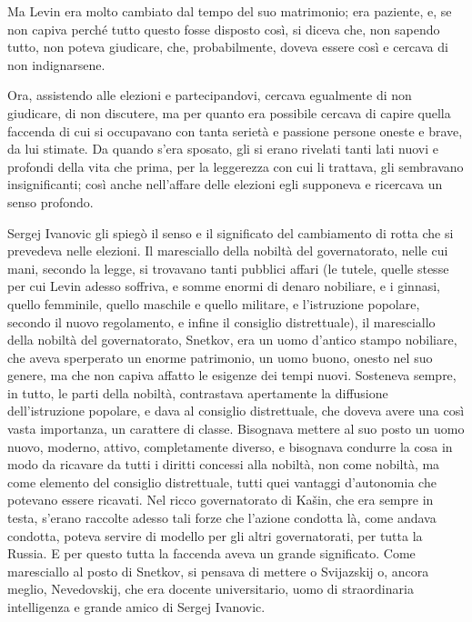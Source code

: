Ma Levin era molto cambiato dal tempo del suo matrimonio; era paziente, e, se non capiva perché tutto questo fosse disposto così, si diceva che, non sapendo tutto, non poteva giudicare, che, probabilmente, doveva essere così e cercava di non indignarsene. 

Ora, assistendo alle elezioni e partecipandovi, cercava egualmente di non giudicare, di non discutere, ma per quanto era possibile cercava di capire quella faccenda di cui si occupavano con tanta serietà e passione persone oneste e brave, da lui stimate. Da quando s'era sposato, gli si erano rivelati tanti lati nuovi e profondi della vita che prima, per la leggerezza con cui li trattava, gli sembravano insignificanti; così anche nell'affare delle elezioni egli supponeva e ricercava un senso profondo. 

Sergej Ivanovic gli spiegò il senso e il significato del cambiamento di rotta che si prevedeva nelle elezioni. Il maresciallo della nobiltà del governatorato, nelle cui mani, secondo la legge, si trovavano tanti pubblici affari (le tutele, quelle stesse per cui Levin adesso soffriva, e somme enormi di denaro nobiliare, e i ginnasi, quello femminile, quello maschile e quello militare, e l'istruzione popolare, secondo il nuovo regolamento, e infine il consiglio distrettuale), il maresciallo della nobiltà del governatorato, Snetkov, era un uomo d'antico stampo nobiliare, che aveva sperperato un enorme patrimonio, un uomo buono, onesto nel suo genere, ma che non capiva affatto le esigenze dei tempi nuovi. Sosteneva sempre, in tutto, le parti della nobiltà, contrastava apertamente la diffusione dell'istruzione popolare, e dava al consiglio distrettuale, che doveva avere una così vasta importanza, un carattere di classe. Bisognava mettere al suo posto un uomo nuovo, moderno, attivo, completamente diverso, e bisognava condurre la cosa in modo da ricavare da tutti i diritti concessi alla nobiltà, non come nobiltà, ma come elemento del consiglio distrettuale, tutti quei vantaggi d'autonomia che potevano essere ricavati. Nel ricco governatorato di Kašin, che era sempre in testa, s'erano raccolte adesso tali forze che l'azione condotta là, come andava condotta, poteva servire di modello per gli altri governatorati, per tutta la Russia. E per questo tutta la faccenda aveva un grande significato. Come maresciallo al posto di Snetkov, si pensava di mettere o Svijazskij o, ancora meglio, Nevedovskij, che era docente universitario, uomo di straordinaria intelligenza e grande amico di Sergej Ivanovic. 

